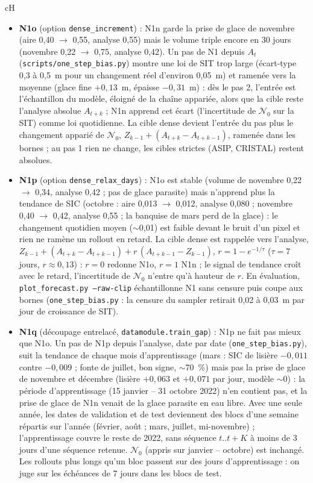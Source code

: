 \documentclass[10pt]{article}
\begin{document}
\begin{bsec}{cH}
\begin{itemize}
\item \textbf{N1o} (option \texttt{dense\_increment}) : N1n garde la prise de glace de novembre (aire 0,40 $\to$ 0,55, analyse 0,55) mais le volume triple encore en 30 jours (novembre 0,22 $\to$ 0,75, analyse 0,42). Un pas de N1 depuis $A_t$ (\texttt{scripts/one\_step\_bias.py}) montre une loi de SIT trop large (écart-type 0,3 à 0,5~m pour un changement réel d'environ 0,05~m) et ramenée vers la moyenne (glace fine $+0{,}13$~m, épaisse $-0{,}31$~m) : dès le pas 2, l'entrée est l'échantillon du modèle, éloigné de la chaîne appariée, alors que la cible reste l'analyse absolue $A_{t+k}$ ; N1n apprend cet écart (l'incertitude de $\mathcal N_0$ sur la SIT) comme loi quotidienne. La cible dense devient l'entrée du pas plus le changement apparié de $\mathcal N_0$, $Z_{k-1} + (A_{t+k} - A_{t+k-1})$, ramenée dans les bornes ; au pas 1 rien ne change, les cibles strictes (ASIP, CRISTAL) restent absolues.
\item \textbf{N1p} (option \texttt{dense\_relax\_days}) : N1o est stable (volume de novembre 0,22 $\to$ 0,34, analyse 0,42 ; pas de glace parasite) mais n'apprend plus la tendance de SIC (octobre : aire 0,013 $\to$ 0,012, analyse 0,080 ; novembre 0,40 $\to$ 0,42, analyse 0,55 ; la banquise de mars perd de la glace) : le changement quotidien moyen ($\sim$0,01) est faible devant le bruit d'un pixel et rien ne ramène un rollout en retard. La cible dense est rappelée vers l'analyse, $Z_{k-1} + (A_{t+k} - A_{t+k-1}) + r\,(A_{t+k-1} - Z_{k-1})$, $r = 1 - e^{-1/\tau}$ ($\tau = 7$ jours, $r \approx 0{,}13$) : $r = 0$ redonne N1o, $r = 1$ N1n ; le signal de tendance croît avec le retard, l'incertitude de $\mathcal N_0$ n'entre qu'à hauteur de $r$. En évaluation, \texttt{plot\_forecast.py --raw-clip} échantillonne N1 sans censure puis coupe aux bornes (\texttt{one\_step\_bias.py} : la censure du sampler retirait 0,02 à 0,03~m par jour de croissance de SIT).
\item \textbf{N1q} (découpage entrelacé, \texttt{datamodule.train\_gap}) : N1p ne fait pas mieux que N1o. Un pas de N1p depuis l'analyse, date par date (\texttt{one\_step\_bias.py}), suit la tendance de chaque mois d'apprentissage (mars : SIC de lisière $-0{,}011$ contre $-0{,}009$ ; fonte de juillet, bon signe, $\sim$70~\%) mais pas la prise de glace de novembre et décembre (lisière $+0{,}063$ et $+0{,}071$ par jour, modèle $\sim$0) : la période d'apprentissage (15 janvier -- 31 octobre 2022) n'en contient pas, et la prise de glace de N1n venait de la glace parasite en eau libre. Avec une seule année, les dates de validation et de test deviennent des blocs d'une semaine répartis sur l'année (février, août ; mars, juillet, mi-novembre) ; l'apprentissage couvre le reste de 2022, sans séquence $t..t+K$ à moins de 3 jours d'une séquence retenue. $\mathcal N_0$ (appris sur janvier -- octobre) est inchangé. Les rollouts plus longs qu'un bloc passent sur des jours d'apprentissage : on juge sur les échéances de 7 jours dans les blocs de test.

\end{itemize}
\end{bsec}
\end{document}
